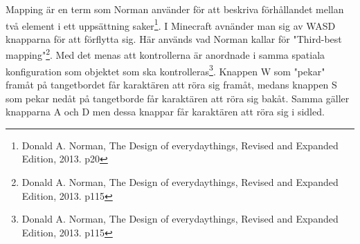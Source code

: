 
Mapping är en term som Norman använder för att beskriva förhållandet mellan två
element i ett uppsättning saker\footnote{Donald A. Norman, The Design of everydaythings, Revised and Expanded Edition, 2013. p20}. 
I Minecraft avnänder
man sig av WASD knapparna för att förflytta sig. Här används vad Norman kallar för 
"Third-best mapping"\footnote{Donald A. Norman, The Design of everydaythings, Revised and Expanded Edition, 2013. p115}. Med det menas att kontrollerna 
är anordnade i samma spatiala konfiguration som objektet som ska kontrolleras\footnote{Donald A. Norman, The Design of everydaythings, Revised and Expanded Edition, 2013. p115}.
Knappen W som "pekar" framåt på tangetbordet får karaktären att röra sig framåt, medans knappen S som pekar nedåt på tangetborde 
får karaktären att röra sig bakåt. Samma gäller knapparna A och D men dessa knappar får karaktären att röra sig i sidled. 

